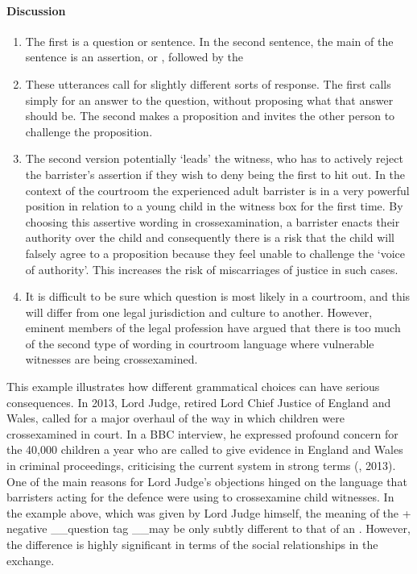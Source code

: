 \documentclass[letterpaper,10pt,english]{sphinxmanual}
\begin{document}
\paragraph{Discussion}
\label{\detokenize{content/session_00/Part_00_01:id6}}\begin{enumerate}
%
\item {} 
The first is a question or  sentence. In the second sentence, the main  of the sentence is an assertion, or , followed by the 

\item {} 
These utterances call for slightly different sorts of response. The first calls simply for an answer to the question, without proposing what that answer should be. The second makes a proposition and invites the other person to challenge the proposition.

\item {} 
The second version potentially ‘leads’ the witness, who has to actively reject the barrister’s assertion if they wish to deny being the first to hit out. In the context of the courtroom the experienced adult barrister is in a very powerful position in relation to a young child in the witness box for the first time. By choosing this assertive wording in cross\sphinxhyphen{}examination, a barrister enacts their authority over the child and consequently there is a risk that the child will falsely agree to a
proposition because they feel unable to challenge the ‘voice of authority’. This increases the risk of miscarriages of justice in such cases.

\item {} 
It is difficult to be sure which question is most likely in a courtroom, and this will differ from one legal jurisdiction and culture to another. However, eminent members of the legal profession have argued that there is too much of the second type of wording in courtroom language where vulnerable witnesses are being cross\sphinxhyphen{}examined.

\end{enumerate}

This example illustrates how different grammatical choices can have serious consequences. In 2013, Lord Judge, retired Lord Chief Justice of England and Wales, called for a major overhaul of the way in which children were cross\sphinxhyphen{}examined in court. In a BBC interview, he expressed profound concern for the 40,000 children a year who are called to give evidence in England and Wales in criminal proceedings, criticising the current system in strong terms (, 2013). One of the main reasons for
Lord Judge’s objections hinged on the language that barristers acting for the defence were using to cross\sphinxhyphen{}examine child witnesses. In the example above, which was given by Lord Judge himself, the meaning of the + negative \_\_question tag \_\_may be only subtly different to that of an . However, the difference is highly significant in terms of the social relationships in the exchange.
\end{document}
